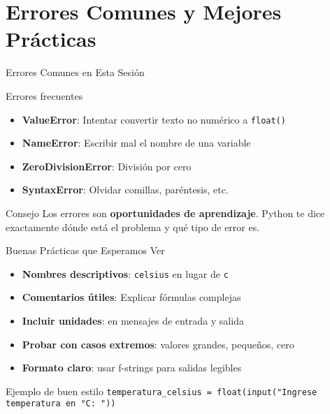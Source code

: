 \documentclass[10pt]{beamer}
\begin{document}
\section{Errores Comunes y Mejores Prácticas}

\begin{frame}{Errores Comunes en Esta Sesión}
  \begin{block}{Errores frecuentes}
    \begin{itemize}
      \item \textbf{ValueError}: Intentar convertir texto no numérico a \texttt{float()}
      \item \textbf{NameError}: Escribir mal el nombre de una variable
      \item \textbf{ZeroDivisionError}: División por cero
      \item \textbf{SyntaxError}: Olvidar comillas, paréntesis, etc.
    \end{itemize}
  \end{block}
  
  \begin{alertblock}{Consejo}
    Los errores son \textbf{oportunidades de aprendizaje}. Python te dice exactamente dónde está el problema y qué tipo de error es.
  \end{alertblock}
\end{frame}

\begin{frame}{Buenas Prácticas que Esperamos Ver}
  \begin{itemize}
    \item \textbf{Nombres descriptivos}: \texttt{celsius} en lugar de \texttt{c}
    \item \textbf{Comentarios útiles}: Explicar fórmulas complejas
    \item \textbf{Incluir unidades}: en mensajes de entrada y salida
    \item \textbf{Probar con casos extremos}: valores grandes, pequeños, cero
    \item \textbf{Formato claro}: usar f-strings para salidas legibles
  \end{itemize}
  
  \begin{block}{Ejemplo de buen estilo}
    \texttt{temperatura\_celsius = float(input("Ingrese temperatura en °C: "))}
  \end{block}
\end{frame}
\end{document}
